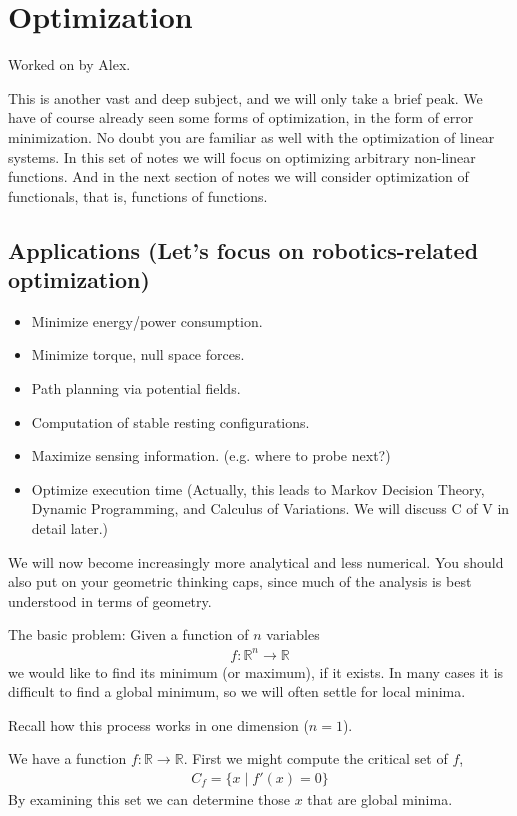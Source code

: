 \chapter{Optimization}

Worked on by Alex.

This is another vast and deep subject, and we will only take a brief peak.
We have of course already seen some forms of optimization, in the form of error minimization.
No doubt you are familiar as well with the optimization of linear systems.
In this set of notes we will focus on optimizing arbitrary non-linear functions.
And in the next section of notes we will consider optimization of functionals, that is, functions of functions.

\section{Applications (Let's focus on robotics-related optimization)}

\begin{itemize}
  \item Minimize energy/power consumption.
  \item Minimize torque, null space forces.
  \item Path planning via potential fields.
  \item Computation of stable resting configurations.
  \item Maximize sensing information. (e.g. where to probe next?)
  \item Optimize execution time (Actually, this leads to Markov Decision Theory, Dynamic Programming, and Calculus of Variations. We will discuss C of V in detail later.)
\end{itemize}

We will now become increasingly more analytical and less numerical.
You should also put on your geometric thinking caps, since much of the analysis is best understood in terms of geometry.

The basic problem: Given a function of $n$ variables
\begin{align}
  f: \mathbb{R}^n \rightarrow \mathbb{R}
\end{align}
we would like to find its minimum (or maximum), if it exists.
In many cases it is difficult to find a global minimum, so we will often settle for local minima.

Recall how this process works in one dimension ($n = 1$).

We have a function $f: \mathbb{R} \rightarrow \mathbb{R}$. First we might compute the critical set of $f$,
\begin{align}
  C_f = \{ x \mid f'(x) = 0 \}
\end{align}
By examining this set we can determine those $x$ that are global minima.

